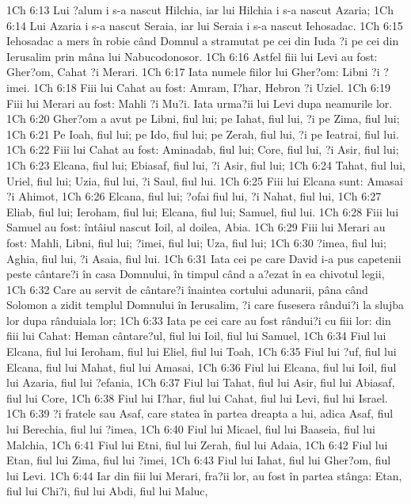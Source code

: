1Ch 6:13  Lui ?alum i s-a nascut Hilchia, iar lui Hilchia i s-a nascut Azaria;
1Ch 6:14  Lui Azaria i s-a nascut Seraia, iar lui Seraia i s-a nascut Iehosadac.
1Ch 6:15  Iehosadac a mers în robie când Domnul a stramutat pe cei din Iuda ?i pe cei din Ierusalim prin mâna lui Nabucodonosor.
1Ch 6:16  Astfel fiii lui Levi au fost: Gher?om, Cahat ?i Merari.
1Ch 6:17  Iata numele fiilor lui Gher?om: Libni ?i ?imei.
1Ch 6:18  Fiii lui Cahat au fost: Amram, I?har, Hebron ?i Uziel.
1Ch 6:19  Fiii lui Merari au fost: Mahli ?i Mu?i. Iata urma?ii lui Levi dupa neamurile lor.
1Ch 6:20  Gher?om a avut pe Libni, fiul lui; pe Iahat, fiul lui, ?i pe Zima, fiul lui;
1Ch 6:21  Pe Ioah, fiul lui; pe Ido, fiul lui; pe Zerah, fiul lui, ?i pe Ieatrai, fiul lui.
1Ch 6:22  Fiii lui Cahat au fost: Aminadab, fiul lui; Core, fiul lui, ?i Asir, fiul lui;
1Ch 6:23  Elcana, fiul lui; Ebiasaf, fiul lui, ?i Asir, fiul lui;
1Ch 6:24  Tahat, fiul lui, Uriel, fiul lui; Uzia, fiul lui, ?i Saul, fiul lui.
1Ch 6:25  Fiii lui Elcana sunt: Amasai ?i Ahimot,
1Ch 6:26  Elcana, fiul lui; ?ofai fiul lui, ?i Nahat, fiul lui,
1Ch 6:27  Eliab, fiul lui; Ieroham, fiul lui; Elcana, fiul lui; Samuel, fiul lui.
1Ch 6:28  Fiii lui Samuel au fost: întâiul nascut Ioil, al doilea, Abia.
1Ch 6:29  Fiii lui Merari au fost: Mahli, Libni, fiul lui; ?imei, fiul lui; Uza, fiul lui;
1Ch 6:30  ?imea, fiul lui; Aghia, fiul lui, ?i Asaia, fiul lui.
1Ch 6:31  Iata cei pe care David i-a pus capetenii peste cântare?i în casa Domnului, în timpul când a a?ezat în ea chivotul legii,
1Ch 6:32  Care au servit de cântare?i înaintea cortului adunarii, pâna când Solomon a zidit templul Domnului în Ierusalim, ?i care fusesera rândui?i la slujba lor dupa rânduiala lor;
1Ch 6:33  Iata pe cei care au fost rândui?i cu fiii lor: din fiii lui Cahat: Heman cântare?ul, fiul lui Ioil, fiul lui Samuel,
1Ch 6:34  Fiul lui Elcana, fiul lui Ieroham, fiul lui Eliel, fiul lui Toah,
1Ch 6:35  Fiul lui ?uf, fiul lui Elcana, fiul lui Mahat, fiul lui Amasai,
1Ch 6:36  Fiul lui Elcana, fiul lui Ioil, fiul lui Azaria, fiul lui ?efania,
1Ch 6:37  Fiul lui Tahat, fiul lui Asir, fiul lui Abiasaf, fiul lui Core,
1Ch 6:38  Fiul lui I?har, fiul lui Cahat, fiul lui Levi, fiul lui Israel.
1Ch 6:39  ?i fratele sau Asaf, care statea în partea dreapta a lui, adica Asaf, fiul lui Berechia, fiul lui ?imea,
1Ch 6:40  Fiul lui Micael, fiul lui Baaseia, fiul lui Malchia,
1Ch 6:41  Fiul lui Etni, fiul lui Zerah, fiul lui Adaia,
1Ch 6:42  Fiul lui Etan, fiul lui Zima, fiul lui ?imei,
1Ch 6:43  Fiul lui Iahat, fiul lui Gher?om, fiul lui Levi.
1Ch 6:44  Iar din fiii lui Merari, fra?ii lor, au fost în partea stânga: Etan, fiul lui Chi?i, fiul lui Abdi, fiul lui Maluc,
